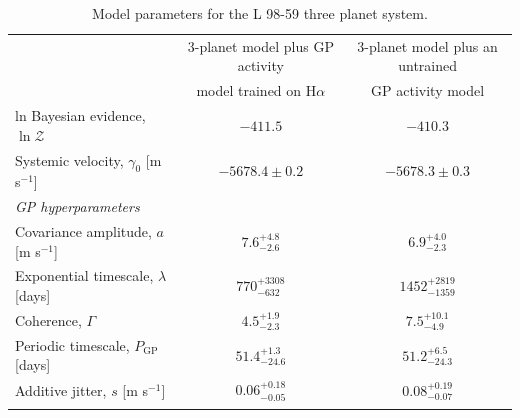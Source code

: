 \documentclass[longauth]{aa}
\newcommand{\mps}{m s$^{-1}$}
\begin{document}
\begin{table}[t]
  \caption{Model parameters for the L 98-59 three planet system.}
  \label{tab:results}
  \centering
  \small
  \begin{tabular}{lcc}  
    \hline\noalign{\smallskip}
    & 3-planet model plus GP activity & 3-planet model plus an untrained \\
    & model trained on H$\alpha$ & GP activity model \\
    \noalign{\smallskip}
    \hline
    \noalign{\smallskip}
    ln Bayesian evidence, $\ln{\mathcal{Z}}$ & $-411.5$ & $-410.3$ \\
    \noalign{\smallskip}
    \hline
    \noalign{\smallskip}
    Systemic velocity, $\gamma_0$ [\mps{]} & $-5678.4\pm 0.2$ & $-5678.3\pm 0.3$ \\
    \noalign{\smallskip}
    \hline
    \noalign{\smallskip}
    
    \emph{GP hyperparameters} && \\
    \noalign{\smallskip}
    Covariance amplitude, $a$ [\mps{]} & $7.6^{+4.8}_{-2.6}$ & $6.9^{+4.0}_{-2.3}$ \\
    \noalign{\smallskip}
    Exponential timescale, $\lambda$ [days] & $770^{+3308}_{-632}$ & $1452^{+2819}_{-1359}$ \\
    \noalign{\smallskip}
    Coherence, $\Gamma$ & $4.5^{+1.9}_{-2.3}$ & $7.5^{+10.1}_{-4.9}$ \\
    \noalign{\smallskip}
    Periodic timescale, $P_{\text{GP}}$ [days] & $51.4^{+1.3}_{-24.6}$ & $51.2^{+6.5}_{-24.3}$ \\
    \noalign{\smallskip}
    Additive jitter, $s$ [\mps{]} & $0.06^{+0.18}_{-0.05}$ & $0.08^{+0.19}_{-0.07}$ \\
    \noalign{\smallskip}
    \hline
    \noalign{\smallskip}
    

\end{tabular}
\end{table}
\end{document}
